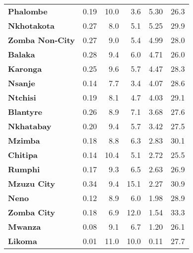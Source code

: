 \begin{tabular}{lrrrrr}
\textbf{Phalombe      } &        0.19 &        10.0 &          3.6 &             5.30 &        26.3 \\
\textbf{Nkhotakota    } &        0.27 &         8.0 &          5.1 &             5.25 &        29.9 \\
\textbf{Zomba Non-City} &        0.27 &         9.0 &          5.4 &             4.99 &        28.0 \\
\textbf{Balaka        } &        0.28 &         9.4 &          6.0 &             4.71 &        26.0 \\
\textbf{Karonga       } &        0.25 &         9.6 &          5.7 &             4.47 &        28.3 \\
\textbf{Nsanje        } &        0.14 &         7.7 &          3.4 &             4.07 &        28.6 \\
\textbf{Ntchisi       } &        0.19 &         8.1 &          4.7 &             4.03 &        29.1 \\
\textbf{Blantyre      } &        0.26 &         8.9 &          7.1 &             3.68 &        27.6 \\
\textbf{Nkhatabay     } &        0.20 &         9.4 &          5.7 &             3.42 &        27.5 \\
\textbf{Mzimba        } &        0.18 &         8.8 &          6.3 &             2.83 &        30.1 \\
\textbf{Chitipa       } &        0.14 &        10.4 &          5.1 &             2.72 &        25.5 \\
\textbf{Rumphi        } &        0.17 &         9.3 &          6.5 &             2.63 &        26.9 \\
\textbf{Mzuzu City    } &        0.34 &         9.4 &         15.1 &             2.27 &        30.9 \\
\textbf{Neno          } &        0.12 &         8.9 &          6.0 &             1.98 &        28.9 \\
\textbf{Zomba City    } &        0.18 &         6.9 &         12.0 &             1.54 &        33.3 \\
\textbf{Mwanza        } &        0.08 &         9.1 &          6.7 &             1.20 &        26.1 \\
\textbf{Likoma        } &        0.01 &        11.0 &         10.0 &             0.11 &        27.7 \\
\bottomrule
\end{tabular}
